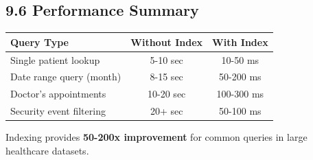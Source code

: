 \subsection*{9.6 Performance Summary}

\begin{tabular}{lcc}
\textbf{Query Type} & \textbf{Without Index} & \textbf{With Index} \\
\hline
Single patient lookup & 5-10 sec & 10-50 ms \\
Date range query (month) & 8-15 sec & 50-200 ms \\
Doctor's appointments & 10-20 sec & 100-300 ms \\
Security event filtering & 20+ sec & 50-100 ms \\
\end{tabular}

Indexing provides \textbf{50-200x improvement} for common queries in large healthcare datasets.

